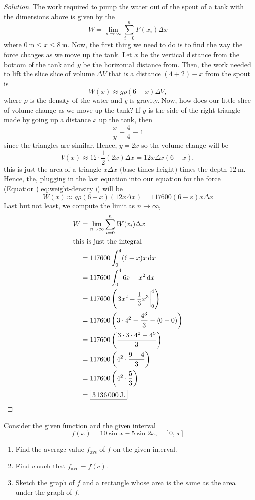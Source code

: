 \begin{proof}[Solution]
The work required to pump the water out of the spout of a tank with the
dimensions above is given by the
\[
W=\lim_{n\to\infty}\sum_{i=0}^n F(x_i)\Delta x
\]
where $\SI{0}{\meter}\leq x\leq\SI{8}{\meter}$. Now, the first thing we
need to do is to find the way the force changes as we move up the tank. Let
$x$ be the vertical distance from the bottom of the tank and $y$ be the
horizontal distance from. Then, the work needed to lift the slice slice of
volume $\Delta V$ that is a distance $(4+2)-x$ from the spout is
\begin{equation}
\label{eq:weight-density}
W(x)\approx g\rho(6-x)\Delta V,
\end{equation}
where $\rho$ is the density of the water and $g$ is gravity. Now, how does
our little slice of volume change as we move up the tank? If $y$ is the
side of the right-triangle made by going up a distance $x$ up the tank, then
\[
\frac{x}{y}=\frac{4}{4}=1
\]
since the triangles are similar. Hence, $y=2x$ so the volume change will be
\[
V(x)\approx 12\cdot\frac{1}{2}(2x)\Delta x=12x\Delta x(6-x),
\]
this is just the area of a triangle $x\Delta x$ (base times height) times
the depth $\SI{12}{\meter}$. Hence, the, plugging in the last equation into
our equation for the force (Equation (\ref{eq:weight-density})) will be
\[
W(x)\approx g\rho(6-x)\left(12 x\Delta x\right)=117600(6-x)x\Delta x
\]
Last but not least, we compute the limit as
$n\to\infty$,
\begin{align*}
W&=\lim_{n\to\infty}\sum_{i=0}^n W(x_i)\Delta x\\
\shortintertext{this is just the integral}
 &=117600\int_0^4(6-x)x\,\mathrm{d} x\\
 &=117600\int_0^46x-x^2\,\mathrm{d} x\\
 &=117600\left(\left.3x^2-\frac{1}{3}x^3\right|_0^4\right)\\
 &=117600\left(3\cdot 4^2-\frac{4^3}{3}-(0-0)\right)\\
 &=117600\left(\frac{3\cdot 3\cdot 4^2-4^3}{3}\right)\\
 &=117600\left(4^2\cdot\frac{9-4}{3}\right)\\
 &=117600\left(4^2\cdot\frac{5}{3}\right)\\
 &=\boxed{\SI{3136000}{\joule}.}
\end{align*}
\end{proof}
\begin{problem}[WebAssign, HW8, 7]
Consider the given function and the given interval
\[
f(x)=10\sin x-5\sin 2x,\quad[0,\pi]
\]
\begin{enumerate}[label=(\alph*)]
\item Find the average value $f_{\text{ave}}$ of $f$ on the given
  interval.
\item Find $c$ such that $f_{\text{ave}}=f(c)$.
\item Sketch the graph of $f$ and a rectangle whose area is the same as the
  area under the graph of $f$.
\end{enumerate}
\end{problem}

